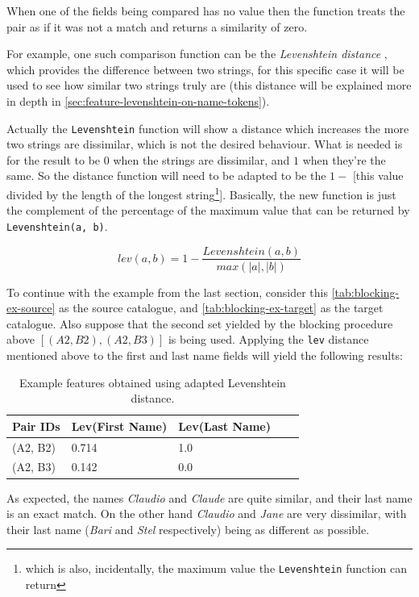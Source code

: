 \documentclass[epsfig,a4paper,11pt,titlepage,twoside,openany]{book}
\begin{document}
When one of the fields being compared has no value then the function treats the
pair as if it was not a match and returns a similarity of zero.

For example, one such comparison function can be the \textit{Levenshtein distance} \cite{levenshtein1966binary}, which provides the difference between two strings, for this specific case it will be used to see how similar two strings truly are (this distance will be explained more in depth in \autoref{sec:feature-levenshtein-on-name-tokens}). 

Actually the \texttt{Levenshtein} function will show a distance which increases the more two strings are dissimilar, which is not the desired behaviour. What is needed is for the result to be $0$ when the strings are dissimilar, and $1$ when they're the same. So the distance function will need to be adapted to be the $1 -$ [this value divided by the length of the longest string\footnote{which is also, incidentally, the maximum value the \texttt{Levenshtein} function can return}]. Basically, the new function is just the complement of the percentage of the maximum value that can be returned by \texttt{Levenshtein(a, b)}.

$$
lev(a,b) = 1 - \frac{Levenshtein(a, b)}{max(|a|, |b|)}
$$

To continue with the example from the last section, consider this \autoref{tab:blocking-ex-source} as the source catalogue, and \autoref{tab:blocking-ex-target} as the target catalogue. Also suppose that the second
set yielded by the blocking procedure above $[(A2, B2), (A2, B3)]$ is being used. Applying the
\texttt{lev} distance mentioned above to the first and last name fields will
yield the following results:

\begin{table}[H]
  \centering
  \begin{tabular}{l|l|l|l|l}
    Pair IDs & Lev(First Name) & Lev(Last Name) \\ \hline
    (A2, B2) & 0.714           & 1.0            \\
    (A2, B3) & 0.142           & 0.0           
  \end{tabular}
  \caption{Example features obtained using adapted Levenshtein distance.}
  \label{tab:ex-feature-levens}
\end{table}

As expected, the names \textit{Claudio} and \textit{Claude} are quite similar,
and their last name is an exact match. On the other hand \textit{Claudio} and
\textit{Jane} are very dissimilar, with their last name (\textit{Bari} and
\textit{Stel} respectively) being as different as possible.
\end{document}
